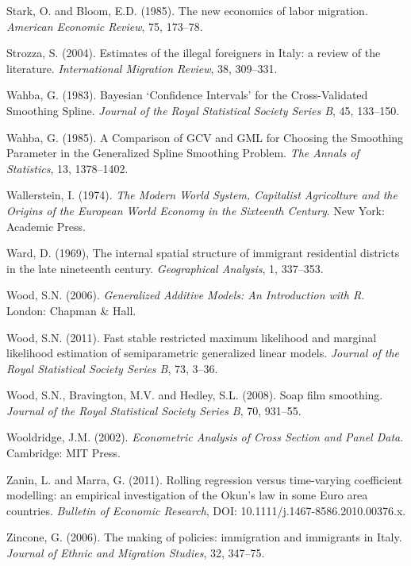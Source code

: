 \documentclass[12pt]{article}
\theoremstyle{definition}
\theoremstyle{plain}
\begin{document}
\begin{thebibliography}{99}
\bibitem{} Stark, O. and Bloom, E.D. (1985). The new economics of labor migration. \textit{American Economic Review}, 75, 173--78.

\bibitem{} Strozza, S. (2004). Estimates of the illegal foreigners in Italy: a review of the literature. \textit{International Migration Review}, 38, 309--331.

\bibitem{} Wahba, G. (1983). Bayesian `Confidence Intervals' for the Cross-Validated Smoothing Spline. \textit{Journal of the Royal Statistical Society Series B}, 45, 133--150.

\bibitem{} Wahba, G. (1985). A Comparison of GCV and GML for Choosing the Smoothing Parameter in the Generalized Spline Smoothing Problem. \textit{The Annals of Statistics}, 13, 1378--1402.

\bibitem{} Wallerstein, I. (1974). \textit{The Modern World System, Capitalist Agricolture and the Origins of the European World Economy in the Sixteenth Century}. New York: Academic Press.

\bibitem{} Ward, D. (1969), The internal spatial structure of immigrant residential districts in the late nineteenth century. \textit{Geographical Analysis}, 1, 337--353.

\bibitem{} Wood, S.N. (2006). \textit{Generalized Additive Models: An Introduction with R}. London: Chapman \& Hall.

\bibitem{} Wood, S.N. (2011). Fast stable restricted maximum likelihood and marginal likelihood estimation of semiparametric generalized linear models. \textit{Journal of the Royal Statistical Society Series B}, 73, 3--36.

\bibitem{} Wood, S.N., Bravington, M.V. and Hedley, S.L. (2008). Soap film smoothing. \textit{Journal of the Royal Statistical Society Series B}, 70, 931--55.

\bibitem{} Wooldridge, J.M. (2002). \textit{Econometric Analysis of Cross Section and Panel Data}. Cambridge: MIT Press.

\bibitem{} Zanin, L. and Marra, G. (2011). Rolling regression versus time-varying coefficient modelling: an empirical investigation of the Okun's law in some Euro area countries. \textit{Bulletin of Economic Research}, DOI: 10.1111/j.1467-8586.2010.00376.x.

\bibitem{} Zincone, G. (2006). The making of policies: immigration and immigrants in Italy. \textit{Journal of Ethnic and Migration Studies}, 32, 347--75.

\end{thebibliography}
\end{document}
